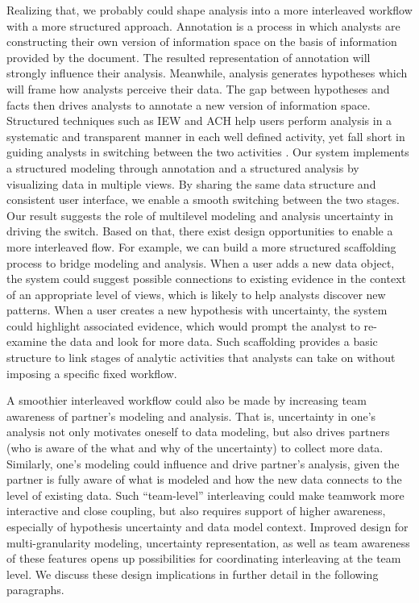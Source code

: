 Realizing that, we probably could shape analysis into a more interleaved
workflow with a more structured approach. Annotation is a process in which analysts are constructing their own version of information space on the basis of information provided by the document. The resulted representation of annotation will strongly influence their analysis. Meanwhile, analysis generates hypotheses which will frame how analysts perceive their data. The gap between hypotheses and facts then drives analysts to annotate a new version of information space. Structured techniques such as IEW and ACH help users
perform analysis in a systematic and transparent manner in each well defined activity, yet fall short in guiding analysts in switching between the two activities
\citep{Kang2011}. Our system implements a structured modeling through annotation and
a structured analysis by visualizing data in multiple views. By sharing the same
data structure and consistent user interface, we enable a smooth switching
between the two stages. Our result suggests the role of multilevel modeling and
analysis uncertainty in driving the switch. Based on that, there exist design
opportunities to enable a more interleaved flow. For example, we can build a more structured scaffolding process to bridge modeling and analysis. When a user adds a
new data object, the system could suggest possible connections to existing
evidence in the context of an appropriate level of views, which is likely to
help analysts discover new patterns. When a user creates a new hypothesis with
uncertainty, the system could highlight associated evidence, which would prompt
the analyst to re-examine the data and look for more data. Such scaffolding
provides a basic structure to link stages of analytic activities that analysts
can take on without imposing a specific fixed workflow.

A smoothier interleaved workflow could also be made by increasing team
awareness of partner's modeling and analysis. That is, uncertainty in one's
analysis not only motivates oneself to data modeling, but also drives partners
(who is aware of the what and why of the uncertainty) to collect more data.
Similarly, one's modeling could influence and drive partner's analysis, given
the partner is fully aware of what is modeled and how the new data connects to
the level of existing data. Such ``team-level'' interleaving could make teamwork
more interactive and close coupling, but also requires support of higher
awareness, especially of hypothesis uncertainty and data model context. Improved
design for multi-granularity modeling, uncertainty representation, as well as
team awareness of these features opens up possibilities for coordinating
interleaving at the team level. We discuss these design implications in further
detail in the following paragraphs.

